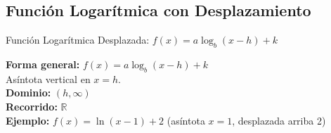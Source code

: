 \documentclass[12pt,a4paper]{article}
\begin{document}
\subsection{Función Logarítmica con Desplazamiento}
\begin{funcbox}{Función Logarítmica Desplazada: $f(x)=a\log_b(x-h)+k$}
\begin{minipage}[t]{0.55\textwidth}
    \textbf{Forma general:} $f(x)=a\log_b(x-h)+k$\\
    Asíntota vertical en $x=h$.\\
    \textbf{Dominio:} $(h,\infty)$\\
    \textbf{Recorrido:} $\mathbb{R}$\\
    \textbf{Ejemplo:} $f(x)=\ln(x-1)+2$ (asíntota $x=1$, desplazada arriba 2)
\end{minipage}\hfill
\begin{minipage}[t]{0.4\textwidth}
    \centering
\end{minipage}
\end{funcbox}

\end{document}
